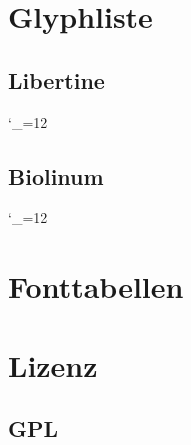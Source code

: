 \documentclass{fontdokuold}
\begin{document}
\chapter{Glyphliste}

\newcommand{\glyphTabEntry}[2]{%
\ifGylphExists{#1}{#2}{%
{\large\texttt{#2}\hfill\Huge\strut\useTextGlyph{#1}{#2}\par}}{}
}

\section{Libertine}
\setlength{\columnsep}{1cm}
\begin{multicols}{2}
{\catcode`\_=12

}
\end{multicols}

\newpage
\section{Biolinum}
\setlength{\columnsep}{1cm}
\begin{multicols}{2}
{\catcode`\_=12

}
\end{multicols}


\chapter{Fonttabellen}

\newcommand{\printFDFont}[1]{\InputIfFileExists{#1.inc}{}{}}
\let\myfdentry=\PrintTableFontShape%



\chapter{Lizenz}

\section{GPL}
\end{document}
